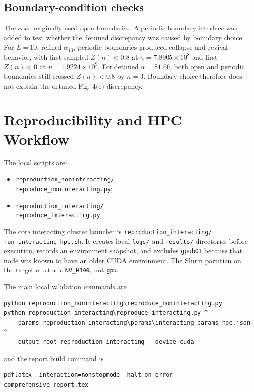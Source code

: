 \documentclass[aps,pra,preprint,superscriptaddress,nofootinbib]{revtex4-2}
\begin{document}
\subsection{Boundary-condition checks}

The code originally used open boundaries. A periodic-boundary interface was added to test whether the detuned discrepancy was caused by boundary choice. For \(L=10\), refined \(\alpha_{13}\), periodic boundaries produced collapse and revival behavior, with first sampled \(Z(n)<0.8\) at \(n=7.8905\times10^8\) and first \(Z(n)<0\) at \(n=1.9224\times10^9\). For detuned \(\alpha=81.60\), both open and periodic boundaries still crossed \(Z(n)<0.8\) by \(n=3\). Boundary choice therefore does not explain the detuned Fig. 4(c) discrepancy.

\section{Reproducibility and HPC Workflow}

The local scripts are:
\begin{itemize}
\item \texttt{reproduction\_noninteracting/}\\
\texttt{reproduce\_noninteracting.py};
\item \texttt{reproduction\_interacting/}\\
\texttt{reproduce\_interacting.py}.
\end{itemize}
The core interacting cluster launcher is
\texttt{reproduction\_interacting/}\\
\texttt{run\_interacting\_hpc.sh}. It creates local \texttt{logs/} and \texttt{results/} directories before execution, records an environment snapshot, and excludes \texttt{gpuh01} because that node was known to have an older CUDA environment. The Slurm partition on the target cluster is \texttt{NV\_H100}, not \texttt{gpu}.

The main local validation commands are
\begin{verbatim}
python reproduction_noninteracting\reproduce_noninteracting.py
python reproduction_interacting\reproduce_interacting.py ^
  --params reproduction_interacting\params\interacting_params_hpc.json ^
  --output-root reproduction_interacting --device cuda
\end{verbatim}
and the report build command is
\begin{verbatim}
pdflatex -interaction=nonstopmode -halt-on-error comprehensive_report.tex
\end{verbatim}
\end{document}
